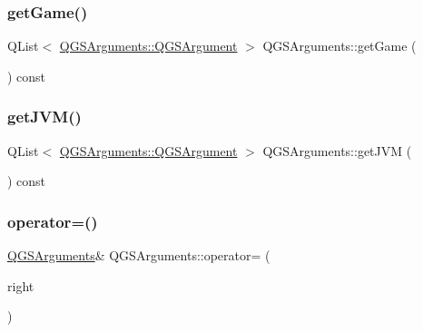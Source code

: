 \mbox{\label{class_q_g_s_arguments_a8f75e12b64f3496591fcdc5a516e325a}} 
\subsubsection{\texorpdfstring{get\+Game()}{getGame()}}
{\footnotesize\ttfamily Q\+List$<$ \mbox{\hyperlink{class_q_g_s_arguments_1_1_q_g_s_argument}{Q\+G\+S\+Arguments\+::\+Q\+G\+S\+Argument}} $>$ Q\+G\+S\+Arguments\+::get\+Game (\begin{DoxyParamCaption}{ }\end{DoxyParamCaption}) const}

\mbox{\label{class_q_g_s_arguments_aac666f076abb596f0a0582d9c45f2af6}} 
\subsubsection{\texorpdfstring{get\+J\+V\+M()}{getJVM()}}
{\footnotesize\ttfamily Q\+List$<$ \mbox{\hyperlink{class_q_g_s_arguments_1_1_q_g_s_argument}{Q\+G\+S\+Arguments\+::\+Q\+G\+S\+Argument}} $>$ Q\+G\+S\+Arguments\+::get\+J\+VM (\begin{DoxyParamCaption}{ }\end{DoxyParamCaption}) const}

\mbox{\label{class_q_g_s_arguments_a14e2926104051921e468d811cf59ab91}} 
\subsubsection{\texorpdfstring{operator=()}{operator=()}\hspace{0.1cm}{\footnotesize\ttfamily [1/2]}}
{\footnotesize\ttfamily \mbox{\hyperlink{class_q_g_s_arguments}{Q\+G\+S\+Arguments}}\& Q\+G\+S\+Arguments\+::operator= (\begin{DoxyParamCaption}\item[{const \mbox{\hyperlink{class_q_g_s_arguments}{Q\+G\+S\+Arguments}} \&}]{right }\end{DoxyParamCaption})\hspace{0.3cm}{\ttfamily [default]}}

